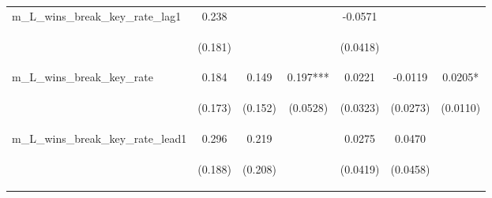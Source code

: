 \documentclass[]{article}
\begin{document}
\begin{center}
\begin{tabular}{lcccccc}
m\_L\_wins\_break\_key\_rate\_lag1 & 0.238 &  &  & -0.0571 &  &  \\
\vspace{4pt} & \begin{footnotesize}(0.181)\end{footnotesize} & \begin{footnotesize}\end{footnotesize} & \begin{footnotesize}\end{footnotesize} & \begin{footnotesize}(0.0418)\end{footnotesize} & \begin{footnotesize}\end{footnotesize} & \begin{footnotesize}\end{footnotesize} \\
m\_L\_wins\_break\_key\_rate & 0.184 & 0.149 & 0.197*** & 0.0221 & -0.0119 & 0.0205* \\
\vspace{4pt} & \begin{footnotesize}(0.173)\end{footnotesize} & \begin{footnotesize}(0.152)\end{footnotesize} & \begin{footnotesize}(0.0528)\end{footnotesize} & \begin{footnotesize}(0.0323)\end{footnotesize} & \begin{footnotesize}(0.0273)\end{footnotesize} & \begin{footnotesize}(0.0110)\end{footnotesize} \\
m\_L\_wins\_break\_key\_rate\_lead1 & 0.296 & 0.219 &  & 0.0275 & 0.0470 &  \\
\vspace{4pt} & \begin{footnotesize}(0.188)\end{footnotesize} & \begin{footnotesize}(0.208)\end{footnotesize} & \begin{footnotesize}\end{footnotesize} & \begin{footnotesize}(0.0419)\end{footnotesize} & \begin{footnotesize}(0.0458)\end{footnotesize} & \begin{footnotesize}\end{footnotesize} \\

\end{tabular}
\end{center}
\end{document}
